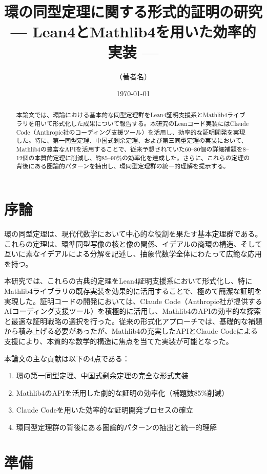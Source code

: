 \documentclass[uplatex, a4paper]{jlreq}
\title{環の同型定理に関する形式的証明の研究\\
\large --- Lean4とMathlib4を用いた効率的実装 ---}
\author{（著者名）}
\date{\today}
\theoremstyle{definition}
\begin{document}
\maketitle

\begin{abstract}
本論文では、環論における基本的な同型定理群をLean4証明支援系とMathlib4ライブラリを用いて形式化した成果について報告する。本研究のLeanコード実装にはClaude Code（Anthropic社のコーディング支援ツール）を活用し、効率的な証明開発を実現した。特に、第一同型定理、中国式剰余定理、および第三同型定理の実装において、Mathlib4の豊富なAPIを活用することで、従来予想されていた60--80個の詳細補題を8--12個の本質的定理に削減し、約85--90\%の効率化を達成した。さらに、これらの定理の背後にある圏論的パターンを抽出し、環同型定理群の統一的理解を提示する。
\end{abstract}

\section{序論}

環の同型定理は、現代代数学において中心的な役割を果たす基本定理群である。これらの定理は、環準同型写像の核と像の関係、イデアルの商環の構造、そして互いに素なイデアルによる分解を記述し、抽象代数学全体にわたって広範な応用を持つ。

本研究では、これらの古典的定理をLean4証明支援系において形式化し、特にMathlib4ライブラリの既存実装を効果的に活用することで、極めて簡潔な証明を実現した。証明コードの開発においては、Claude Code（Anthropic社が提供するAIコーディング支援ツール）を積極的に活用し、Mathlib4のAPIの効率的な探索と最適な証明戦略の選択を行った。従来の形式化アプローチでは、基礎的な補題から積み上げる必要があったが、Mathlib4の充実したAPIとClaude Codeによる支援により、本質的な数学的構造に焦点を当てた実装が可能となった。

本論文の主な貢献は以下の4点である：
\begin{enumerate}
\item 環の第一同型定理、中国式剰余定理の完全な形式実装
\item Mathlib4のAPIを活用した劇的な証明の効率化（補題数85\%削減）
\item Claude Codeを用いた効率的な証明開発プロセスの確立
\item 環同型定理群の背後にある圏論的パターンの抽出と統一的理解
\end{enumerate}

\section{準備}
\end{document}
